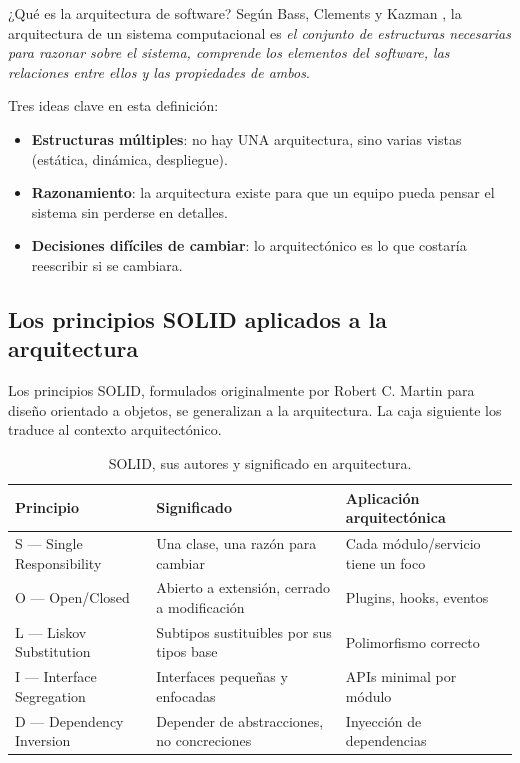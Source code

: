 \begin{cajadefinicion}{¿Qué es la arquitectura de software?}
Según Bass, Clements y Kazman \cite{bass2021software}, la arquitectura
de un sistema computacional es \emph{el conjunto de estructuras
necesarias para razonar sobre el sistema, comprende los elementos del
software, las relaciones entre ellos y las propiedades de ambos}.

Tres ideas clave en esta definición:
\begin{itemize}
\item \textbf{Estructuras múltiples}: no hay UNA arquitectura, sino
varias vistas (estática, dinámica, despliegue).
\item \textbf{Razonamiento}: la arquitectura existe para que un
equipo pueda pensar el sistema sin perderse en detalles.
\item \textbf{Decisiones difíciles de cambiar}: lo arquitectónico es
lo que costaría reescribir si se cambiara.
\end{itemize}
\end{cajadefinicion}

\subsection{Los principios SOLID aplicados a la arquitectura}

Los principios SOLID, formulados originalmente por Robert C.
Martin para diseño orientado a objetos, se generalizan a la
arquitectura. La caja siguiente los traduce al contexto
arquitectónico.


\begin{table}[htbp]
\centering
\caption{SOLID, sus autores y significado en arquitectura.}
\footnotesize
\begin{tabularx}{\textwidth}{lXX}
\toprule
\textbf{Principio} & \textbf{Significado} & \textbf{Aplicación arquitectónica}\\
\midrule
S --- Single Responsibility & Una clase, una razón para cambiar & Cada módulo/servicio tiene un foco\\
O --- Open/Closed & Abierto a extensión, cerrado a modificación & Plugins, hooks, eventos\\
L --- Liskov Substitution & Subtipos sustituibles por sus tipos base & Polimorfismo correcto\\
I --- Interface Segregation & Interfaces pequeñas y enfocadas & APIs minimal por módulo\\
D --- Dependency Inversion & Depender de abstracciones, no concreciones & Inyección de dependencias\\
\bottomrule
\end{tabularx}
\end{table}

